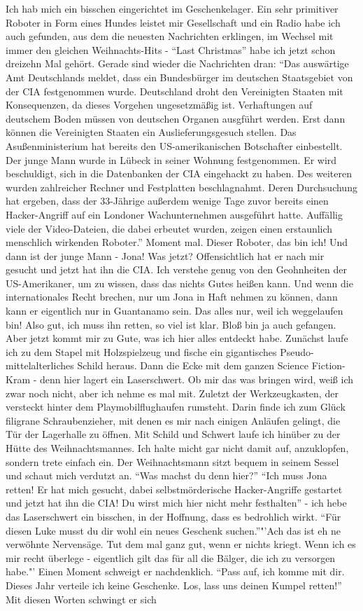 Ich hab mich ein bisschen eingerichtet im Geschenkelager. Ein sehr primitiver Roboter in Form eines Hundes leistet mir Gesellschaft und ein Radio habe ich auch gefunden, aus dem die neuesten Nachrichten erklingen, im Wechsel mit immer den gleichen Weihnachts-Hits - "`Last Christmas"'  habe ich jetzt schon dreizehn Mal gehört. Gerade sind wieder die Nachrichten dran: "`Das auswärtige Amt Deutschlands meldet, dass ein Bundesbürger im deutschen Staatsgebiet von der CIA festgenommen wurde. Deutschland droht den Vereinigten Staaten mit Konsequenzen, da dieses Vorgehen ungesetzmäßig ist. Verhaftungen auf deutschem Boden müssen von deutschen Organen ausgführt werden. Erst dann können die Vereinigten Staaten ein Auslieferungsgesuch stellen. Das Asußenministerium hat bereits den US-amerikanischen Botschafter einbestellt. Der junge Mann wurde in Lübeck in seiner Wohnung festgenommen. Er wird beschuldigt, sich in die Datenbanken der CIA eingehackt zu haben. Des weiteren wurden zahlreicher Rechner und Festplatten beschlagnahmt. Deren Durchsuchung hat ergeben, dass der 33-Jährige außerdem wenige Tage zuvor bereits einen Hacker-Angriff auf ein Londoner Wachunternehmen ausgeführt hatte. Auffällig viele der Video-Dateien, die dabei erbeutet wurden, zeigen einen erstaunlich menschlich wirkenden Roboter."' Moment mal. Dieser Roboter, das bin ich! Und dann ist der junge Mann - Jona! Was jetzt? Offensichtlich hat er nach mir gesucht und jetzt hat ihn die CIA. Ich verstehe genug von den Geohnheiten der US-Amerikaner, um zu wissen, dass das nichts Gutes heißen kann. Und wenn die internationales Recht brechen, nur um Jona in Haft nehmen zu können, dann kann er eigentlich nur in Guantanamo sein. Das alles nur, weil ich weggelaufen bin! Also gut, ich muss ihn retten, so viel ist klar. Bloß bin ja auch gefangen. Aber jetzt kommt mir zu Gute, was ich hier alles entdeckt habe. Zunächst laufe ich zu dem Stapel mit Holzspielzeug und fische ein gigantisches Pseudo-mittelalterliches Schild heraus. Dann die Ecke mit dem ganzen Science Fiction-Kram - denn hier lagert ein Laserschwert. Ob mir das was bringen wird, weiß ich zwar noch nicht, aber ich nehme es mal mit. Zuletzt der Werkzeugkasten, der versteckt hinter dem Playmobilflughaufen rumsteht. Darin finde ich zum Glück filigrane Schraubenzieher, mit denen es mir nach einigen Anläufen gelingt, die Tür der Lagerhalle zu öffnen. Mit Schild und Schwert laufe ich hinüber zu der Hütte des Weihnachtsmannes. Ich halte micht gar nicht damit auf, anzuklopfen, sondern trete einfach ein. Der Weihnachtsmann sitzt bequem in seinem Sessel und schaut mich verdutzt an. "`Was machst du denn hier?"' "`Ich muss Jona retten! Er hat mich gesucht, dabei selbstmörderische Hacker-Angriffe gestartet und jetzt hat ihn die CIA! Du wirst mich hier nicht mehr festhalten"' - ich hebe das Laserschwert ein bisschen, in der Hoffnung, dass es bedrohlich wirkt. "`Für diesen Luke musst du dir wohl ein neues Geschenk suchen."'"'Ach das ist eh ne verwöhnte Nervensäge. Tut dem mal ganz gut, wenn er nichts kriegt. Wenn ich es mir recht überlege - eigentlich gilt das für all die Bälger, die ich zu versorgen habe."' Einen Moment schweigt er nachdenklich. "`Pass auf, ich komme mit dir. Dieses Jahr verteile ich keine Geschenke. Los, lass uns deinen Kumpel retten!"' Mit diesen Worten schwingt er sich 
